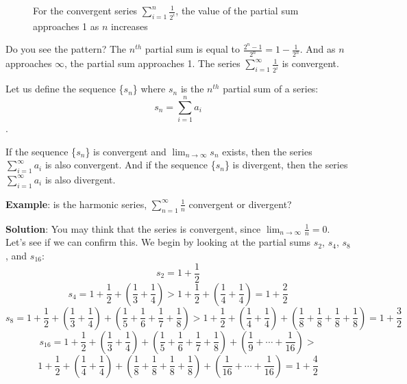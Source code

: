 \begin{figure}[htbp]
\centering
    \caption{For the convergent series $\sum_{i=1}^n \frac{1}{2^i}$, 
    the value of the partial sum approaches 1 as $n$ increases}
    \label{fig:convsum}
\end{figure}

Do you see the pattern? The $n^{th}$ partial sum is equal to 
$\frac{2^n - 1}{2^n} = 1 - \frac{1}{2^n}$. And as $n$ approaches 
$\infty$, the partial sum approaches 1. The series $\sum_{i=1}^\infty 
\frac{1}{2^i}$ is convergent. 

Let us define the sequence \{$s_n$\} where $s_n$ is the $n^{th}$ 
partial sum of a series:
$$s_n = \sum_{i=1}^n a_i$$. 

If the sequence \{$s_n$\} is convergent and $\lim_{n \to \infty} s_n$ 
exists, then the series $\sum_{i=1}^\infty a_i$ is also convergent. 
And if the sequence \{$s_n$\} is divergent, then the series 
$\sum_{i=1}^\infty a_i$ is also divergent.

\textbf{Example}: is the harmonic series, $\sum_{n = 1}^\infty \frac{1}{n}$ 
convergent or divergent?

\textbf{Solution}: You may think that the series is convergent, since $\lim_
{n \to \infty} \frac{1}{n} = 0$. Let's see if we can confirm this. We begin by 
looking at the partial sums $s_2$, $s_4$, $s_8$, and $s_16$:
$$s_2 = 1 + \frac{1}{2}$$
$$s_4 = 1 + \frac{1}{2} + \left(\frac{1}{3} + \frac{1}{4} \right) > 1 + 
\frac{1}{2} + \left( \frac{1}{4} + \frac{1}{4} \right) = 1 + \frac{2}{2}$$
$$s_8 = 1 + \frac{1}{2} + \left(\frac{1}{3} + \frac{1}{4} \right) + \left( 
\frac{1}{5} + \frac{1}{6} + \frac{1}{7} + \frac{1}{8} \right) > 1 + \frac{1}{2} 
+ \left(\frac{1}{4} + \frac{1}{4} \right) + \left( \frac{1}{8} + \frac{1}{8} + 
\frac{1}{8} + \frac{1}{8} \right) = 1 + \frac{3}{2}$$
$$s_{16} = 1 + \frac{1}{2} + \left(\frac{1}{3} + \frac{1}{4} \right) + \left( 
\frac{1}{5} + \frac{1}{6} + \frac{1}{7} + \frac{1}{8} \right) + \left(
\frac{1}{9} + \cdots + \frac{1}{16} \right) > $$
$$1 + \frac{1}{2} + \left(\frac{1}{4} + \frac{1}{4} \right) + \left( 
\frac{1}{8} + \frac{1}{8} + \frac{1}{8} + \frac{1}{8} \right) + \left(
\frac{1}{16} + \cdots + \frac{1}{16} \right) = 1 + \frac{4}{2}$$

